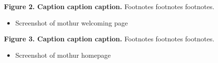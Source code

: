 \documentclass[11pt,]{article}
\providecommand{\tightlist}{%
  \setlength{\itemsep}{0pt}\setlength{\parskip}{0pt}}
\begin{document}
\textbf{Figure 2. Caption caption caption.} Footnotes footnotes
footnotes.

\begin{itemize}
\tightlist
\item
  Screenshot of mothur welcoming page
\end{itemize}

\textbf{Figure 3. Caption caption caption.} Footnotes footnotes
footnotes.

\begin{itemize}
\tightlist
\item
  Screenshot of mothur homepage
\end{itemize}
\end{document}
